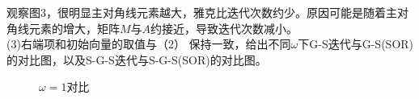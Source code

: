 \documentclass[a4paper,11pt,UTF8]{article}%
\theoremstyle{plain}
\begin{document}
	\indent 观察图3，很明显主对角线元素越大，雅克比迭代次数约少。原因可能是随着主对角线元素的增大，矩阵$M$与$A$约接近，导致迭代次数减小。\\
	\newpage
	\indent(3)右端项和初始向量的取值与（2）	保持一致，给出不同$\omega$下G-S迭代与G-S(SOR)的对比图，以及S-G-S迭代与S-G-S(SOR)的对比图。\\
		\begin{figure}[!h]
		\centering
		\hfill
		\caption{$\omega=1$对比}
	\end{figure}\\
	
\end{document}

